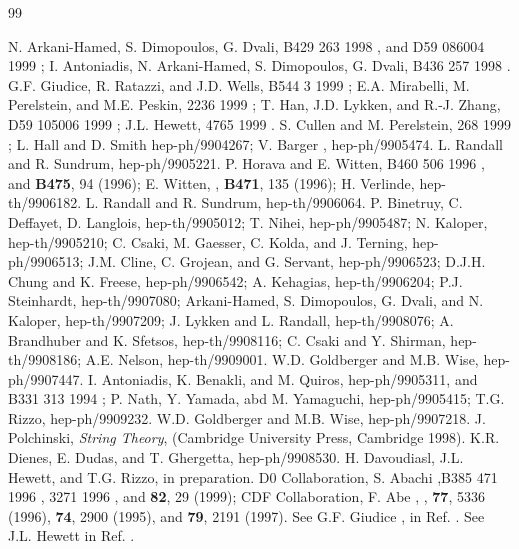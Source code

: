 \begin{thebibliography}{99}

N. Arkani-Hamed, S. Dimopoulos, G. Dvali, \PLB B429 263 1998 , and
\PRD D59 086004 1999 ; I. Antoniadis, N. Arkani-Hamed, S. Dimopoulos, 
G. Dvali,  \PLB B436 257 1998 .
%
G.F. Giudice, R. Ratazzi, and J.D. Wells, \NPB B544 3 1999 ;
E.A. Mirabelli, M. Perelstein, and M.E. Peskin,  2236 1999 ;
T. Han, J.D. Lykken, and R.-J. Zhang, \PRD D59 105006 1999 ;
J.L. Hewett,  4765 1999 .
%
S. Cullen and M. Perelstein,  268 1999 ;
L. Hall and D. Smith hep-ph/9904267;
V. Barger \etal, hep-ph/9905474.
%
L. Randall and R. Sundrum, hep-ph/9905221.
%
P. Horava and E. Witten, \NPB B460 506 1996 , and {\bf B475}, 94 (1996);
E. Witten, \ibid, {\bf B471}, 135 (1996); H. Verlinde, hep-th/9906182.
%
L. Randall and R. Sundrum, hep-th/9906064.
%
P. Binetruy, C. Deffayet, D. Langlois, hep-th/9905012;
T. Nihei, hep-ph/9905487;
N. Kaloper, hep-th/9905210; 
C. Csaki, M. Gaesser, C. Kolda, and J. Terning, hep-ph/9906513;
J.M. Cline, C. Grojean, and G. Servant, hep-ph/9906523;
D.J.H. Chung and K. Freese, hep-ph/9906542;
A. Kehagias, hep-th/9906204;
P.J. Steinhardt, hep-th/9907080;
Arkani-Hamed, S. Dimopoulos, G. Dvali, and N. Kaloper, hep-th/9907209;
J. Lykken and L. Randall, hep-th/9908076; 
A. Brandhuber and K. Sfetsos, hep-th/9908116;
C. Csaki and Y. Shirman, hep-th/9908186;
A.E. Nelson, hep-th/9909001.
%
W.D. Goldberger and M.B. Wise, hep-ph/9907447.
%
I. Antoniadis, K. Benakli, and M. Quiros, hep-ph/9905311, and
\PLB B331 313 1994 ;
P. Nath, Y. Yamada, abd M. Yamaguchi, hep-ph/9905415;
T.G. Rizzo, hep-ph/9909232. 
%
W.D. Goldberger and M.B. Wise, hep-ph/9907218.
%
J. Polchinski, {\it String Theory}, (Cambridge University Press, Cambridge
1998). 
%
K.R. Dienes, E. Dudas, and T. Ghergetta, hep-ph/9908530.
%
H. Davoudiasl, J.L. Hewett, and T.G. Rizzo, in preparation.
%
D0 Collaboration, S. Abachi \etal,\PLB B385 471 1996 ,  3271 1996 , 
and {\bf 82}, 29 (1999);
CDF Collaboration, F. Abe \etal, \ibid, {\bf 77}, 5336 (1996), 
{\bf 74}, 2900 (1995), and {\bf 79}, 2191 (1997).
%
See G.F. Giudice \etal, in Ref. \cite{pheno}.
%
See J.L. Hewett in Ref. \cite{pheno}.

\end{thebibliography}




